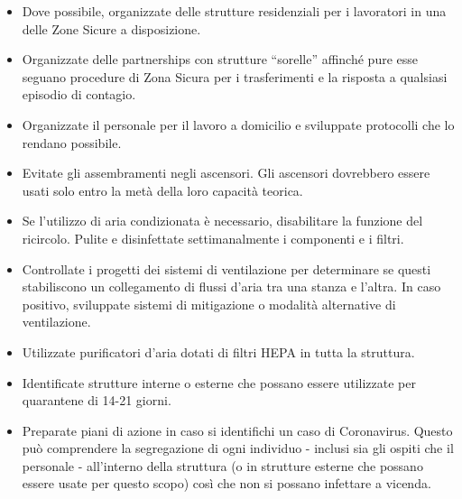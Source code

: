 \documentclass[onecolumn,journal]{IEEEtran}
\begin{document}
\begin{multicols}{2}
\begin{itemize}
  \item Dove possibile, organizzate delle strutture residenziali per i lavoratori in una delle Zone Sicure a disposizione.
  \item Organizzate delle partnerships con strutture “sorelle” affinché pure esse seguano procedure di Zona Sicura per i trasferimenti e la risposta a qualsiasi episodio di contagio.
  \item Organizzate il personale per il lavoro a domicilio e sviluppate protocolli che lo rendano possibile.
  \item Evitate gli assembramenti negli ascensori. Gli ascensori dovrebbero essere usati solo entro la metà della loro capacità teorica.
  \item Se l’utilizzo di aria condizionata è necessario, disabilitare la funzione del ricircolo. Pulite e disinfettate settimanalmente i componenti e i filtri.
  \item Controllate i progetti dei sistemi di ventilazione per determinare se questi stabiliscono un collegamento di flussi d’aria tra una stanza e l’altra. In caso positivo, sviluppate sistemi di mitigazione o modalità alternative di ventilazione.
  \item Utilizzate purificatori d’aria dotati di filtri HEPA in tutta la struttura.
  \item Identificate strutture interne o esterne che possano essere utilizzate per quarantene di 14-21 giorni.
\item Preparate piani di azione in caso si identifichi un caso di Coronavirus. Questo può comprendere la segregazione di ogni individuo - inclusi sia gli ospiti che il personale - all’interno della struttura (o in strutture esterne che possano essere usate per questo scopo) così che non si possano infettare a vicenda.


\end{itemize}


%
%
%
%
%
%




\end{multicols}
\end{document}

